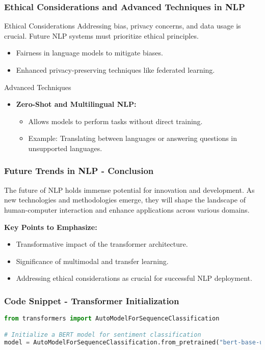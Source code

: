 \documentclass[aspectratio=169]{beamer}
\begin{document}
\begin{frame}[fragile]
    \frametitle{Ethical Considerations and Advanced Techniques in NLP}
    \begin{block}{Ethical Considerations}
        Addressing bias, privacy concerns, and data usage is crucial. Future NLP systems must prioritize ethical principles.
        \begin{itemize}
            \item Fairness in language models to mitigate biases.
            \item Enhanced privacy-preserving techniques like federated learning.
        \end{itemize}
    \end{block}

    \begin{block}{Advanced Techniques}
        \begin{itemize}
            \item \textbf{Zero-Shot and Multilingual NLP:}
            \begin{itemize}
                \item Allows models to perform tasks without direct training.
                \item Example: Translating between languages or answering questions in unsupported languages.
            \end{itemize}
        \end{itemize}
    \end{block}
\end{frame}

\begin{frame}[fragile]
    \frametitle{Future Trends in NLP - Conclusion}
    The future of NLP holds immense potential for innovation and development. As new technologies and methodologies emerge, they will shape the landscape of human-computer interaction and enhance applications across various domains.

    \textbf{Key Points to Emphasize:}
    \begin{itemize}
        \item Transformative impact of the transformer architecture.
        \item Significance of multimodal and transfer learning.
        \item Addressing ethical considerations as crucial for successful NLP deployment.
    \end{itemize}
\end{frame}

\begin{frame}[fragile]
    \frametitle{Code Snippet - Transformer Initialization}
    \begin{lstlisting}[language=Python]
from transformers import AutoModelForSequenceClassification

# Initialize a BERT model for sentiment classification
model = AutoModelForSequenceClassification.from_pretrained("bert-base-uncased")
    \end{lstlisting}
\end{frame}
\end{document}
